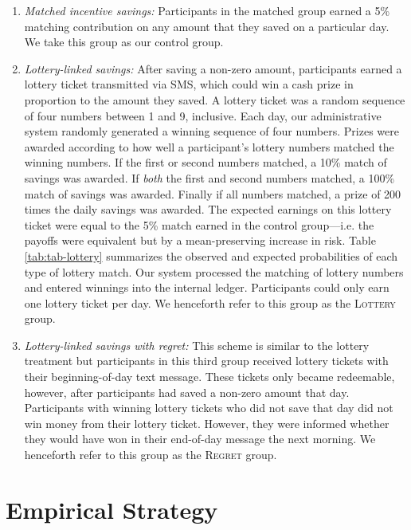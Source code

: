 \documentclass[11pt]{article}
\begin{document}
		\begin{enumerate} \setlength{\itemsep}{1pt}

			\item \textit{Matched incentive savings:} Participants in the matched group earned a 5\% matching contribution on any amount that they saved on a particular day. We take this group as our control group.

			\item \textit{Lottery-linked savings:} After saving a non-zero amount, participants earned a lottery ticket transmitted via SMS, which could win a cash prize in proportion to the amount they saved. A lottery ticket was a random sequence of four numbers between 1 and 9, inclusive. Each day, our administrative system randomly generated a winning sequence of four numbers. Prizes were awarded according to how well a participant's lottery numbers matched the winning numbers. If the first or second numbers matched, a 10\% match of savings was awarded. If \emph{both} the first and second numbers matched, a 100\% match of savings was awarded. Finally if all numbers matched, a prize of 200 times the daily savings was awarded. The expected earnings on this lottery ticket were equal to the 5\% match earned in the control group---i.e. the payoffs were equivalent but by a mean-preserving increase in risk. Table \ref{tab:tab-lottery} summarizes the observed and expected probabilities of each type of lottery match. Our system processed the matching of lottery numbers and entered winnings into the internal ledger. Participants could only earn one lottery ticket per day. We henceforth refer to this group as the \textsc{Lottery} group.

			\item \textit{Lottery-linked savings with regret:} This scheme is similar to the lottery treatment but participants in this third group received lottery tickets with their beginning-of-day text message. These tickets only became redeemable, however, after participants had saved a non-zero amount that day. Participants with winning lottery tickets who did not save that day did not win money from their lottery ticket. However, they were informed whether they would have won in their end-of-day message the next morning. We henceforth refer to this group as the \textsc{Regret} group.

		\end{enumerate}

		

\section{Empirical Strategy} \label{sec:est}
\end{document}
